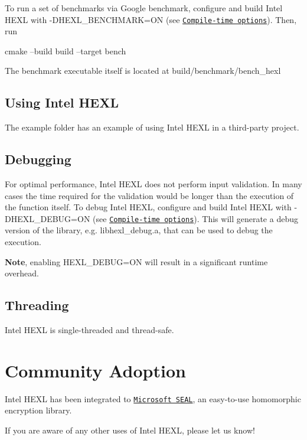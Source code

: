 To run a set of benchmarks via Google benchmark, configure and build Intel H\+E\+XL with {\ttfamily -\/\+D\+H\+E\+X\+L\+\_\+\+B\+E\+N\+C\+H\+M\+A\+RK=ON} (see \href{#compile-time-options}{\tt Compile-\/time options}). Then, run 
\begin{DoxyCode}
cmake --build build --target bench
\end{DoxyCode}
 The benchmark executable itself is located at {\ttfamily build/benchmark/bench\+\_\+hexl}

\subsection*{Using Intel H\+E\+XL}

The {\ttfamily example} folder has an example of using Intel H\+E\+XL in a third-\/party project.

\subsection*{Debugging}

For optimal performance, Intel H\+E\+XL does not perform input validation. In many cases the time required for the validation would be longer than the execution of the function itself. To debug Intel H\+E\+XL, configure and build Intel H\+E\+XL with {\ttfamily -\/\+D\+H\+E\+X\+L\+\_\+\+D\+E\+B\+UG=ON} (see \href{#compile-time-options}{\tt Compile-\/time options}). This will generate a debug version of the library, e.\+g. {\ttfamily libhexl\+\_\+debug.\+a}, that can be used to debug the execution.

{\bfseries Note}, enabling {\ttfamily H\+E\+X\+L\+\_\+\+D\+E\+B\+UG=ON} will result in a significant runtime overhead. \subsection*{Threading}

Intel H\+E\+XL is single-\/threaded and thread-\/safe.

\section*{Community Adoption}

Intel H\+E\+XL has been integrated to \href{https://github.com/Microsoft/SEAL}{\tt Microsoft S\+E\+AL}, an easy-\/to-\/use homomorphic encryption library.

If you are aware of any other uses of Intel H\+E\+XL, please let us know!

